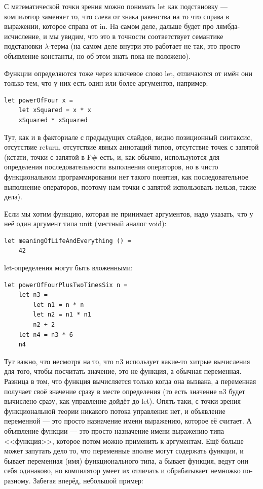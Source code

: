 \documentclass[a5paper]{article}
\begin{document}
С математической точки зрения можно понимать let как подстановку --- компилятор заменяет то, что слева от знака равенства на то что справа в выражении, которое справа от in. На самом деле, дальше будет про лямбда-исчисление, и мы увидим, что это в точности соответствует семантике подстановки $\lambda$-терма (на самом деле внутри это работает не так, это просто объявление константы, но об этом знать пока не положено).

Функции определяются тоже через ключевое слово let, отличаются от имён они только тем, что у них есть один или более аргументов, например:

\begin{verbatim}
let powerOfFour x =
    let xSquared = x * x
    xSquared * xSquared
\end{verbatim}

Тут, как и в факториале с предыдущих слайдов, видно позиционный синтаксис, отсутствие return, отсутствие явных аннотаций типов, отсутствие точек с запятой (кстати, точки с запятой в F\# есть, и, как обычно, используются для определения последовательности выполнения операторов, но в чисто функциональном программировании нет такого понятия, как последовательное выполнение операторов, поэтому нам точки с запятой использовать нельзя, такие дела).

Если мы хотим функцию, которая не принимает аргументов, надо указать, что у неё один аргумент типа unit (местный аналог void):

\begin{verbatim}
let meaningOfLifeAndEverything () =
    42
\end{verbatim}

let-определения могут быть вложенными:
\begin{verbatim}
let powerOfFourPlusTwoTimesSix n =
    let n3 =
        let n1 = n * n
        let n2 = n1 * n1
        n2 + 2
    let n4 = n3 * 6
    n4
\end{verbatim}

Тут важно, что несмотря на то, что n3 использует какие-то хитрые вычисления для того, чтобы посчитать значение, это не функция, а обычная переменная. Разница в том, что функция вычисляется только когда она вызвана, а переменная получает своё значение сразу в месте определения (то есть значение n3 будет вычислено сразу, как управление дойдёт до let). Опять-таки, с точки зрения функциональной теории никакого потока управления нет, и объявление переменной --- это просто назначение имени выражению, которое её считает. А объявление функции --- это просто назначение имени выражению типа <<функция>>, которое потом можно применить к аргументам. Ещё больше может запутать дело то, что переменные вполне могут содержать функции, и бывает переменная (имя) функционального типа, а бывает функция, ведут они себя одинаково, но компилятор умеет их отличать и обрабатывает немножко по-разному. Забегая вперёд, небольшой пример:
\end{document}

